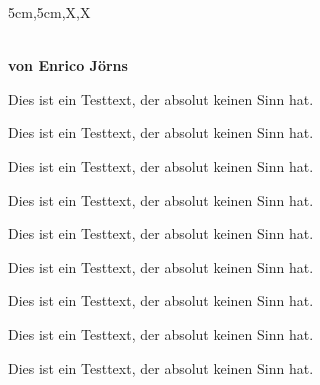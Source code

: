 \documentclass[a3paper,13pt,scifiposter,style=scifi]{tubsposter}
\begin{document}
  \begin{tubsposter}{5cm,5cm,X,X}
  \begin{posterrow}
    \bfseries{}\\[1em]
    von Enrico Jörns
  \end{posterrow}
  \begin{posterrow}[X,3cm,X]
    \begin{postercol}
      Dies ist ein Testtext, der absolut keinen Sinn hat.
    \end{postercol}
    \begin{postercol}
      Dies ist ein Testtext, der absolut keinen Sinn hat.
    \end{postercol}
    \begin{postercol}
      Dies ist ein Testtext, der absolut keinen Sinn hat.
    \end{postercol}
  \end{posterrow}
  \begin{posterrow}[X,X,X]
    \begin{postercol}
      Dies ist ein Testtext, der absolut keinen Sinn hat.
    \end{postercol}
    \begin{postercol}
      Dies ist ein Testtext, der absolut keinen Sinn hat.
    \end{postercol}
    \begin{postercol}
      Dies ist ein Testtext, der absolut keinen Sinn hat.
    \end{postercol}
  \end{posterrow}
  \begin{posterrow}[5cm,X,5cm]
    \begin{postercol}
      Dies ist ein Testtext, der absolut keinen Sinn hat.
    \end{postercol}
    \begin{postercol}
      Dies ist ein Testtext, der absolut keinen Sinn hat.
    \end{postercol}
    \begin{postercol}
      Dies ist ein Testtext, der absolut keinen Sinn hat.
    \end{postercol}
  \end{posterrow}
\end{tubsposter}
~
\newpage
\end{document}
